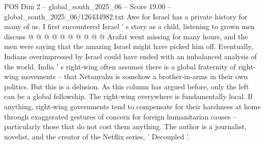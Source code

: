 \begin{textsample}{POS Dim 2 – global\_south\_2025\_06 – Score 19.00 – global\_south\_2025\_06/126434982.txt}
Awe for Israel has a private history for many of us.
I first encountered Israel ' s story as a child, listening to grown men discuss @ @ @ @ @ @ @ @ @ @ Arafat went missing for many hours, and the men were saying that the amazing Israel might have picked him off.
Eventually, Indians overimpressed by Israel could have ended with an imbalanced analysis of the world.
India ' s right-wing often assumes there is a global fraternity of right-wing movements -- that Netanyahu is somehow a brother-in-arms in their own politics.
But this is a delusion.
As this column has argued before, only the left can be a global fellowship.
The right-wing everywhere is fundamentally local.
If anything, right-wing governments tend to compensate for their harshness at home through exaggerated gestures of concern for foreign humanitarian causes -- particularly those that do not cost them anything.
The author is a journalist, novelist, and the creator of the Netflix series, ' Decoupled '.

\end{textsample}
